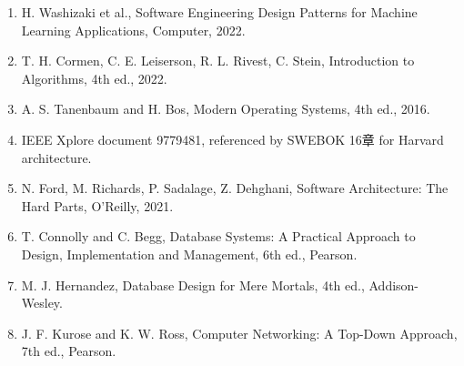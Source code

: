 \begin{enumerate}[leftmargin=2em]
\item H. Washizaki et al., Software Engineering Design Patterns for Machine Learning Applications, Computer, 2022.
\item T. H. Cormen, C. E. Leiserson, R. L. Rivest, C. Stein, Introduction to Algorithms, 4th ed., 2022.
\item A. S. Tanenbaum and H. Bos, Modern Operating Systems, 4th ed., 2016.
\item IEEE Xplore document 9779481, referenced by SWEBOK 16章 for Harvard architecture.
\item N. Ford, M. Richards, P. Sadalage, Z. Dehghani, Software Architecture: The Hard Parts, O'Reilly, 2021.
\item T. Connolly and C. Begg, Database Systems: A Practical Approach to Design, Implementation and Management, 6th ed., Pearson.
\item M. J. Hernandez, Database Design for Mere Mortals, 4th ed., Addison-Wesley.
\item J. F. Kurose and K. W. Ross, Computer Networking: A Top-Down Approach, 7th ed., Pearson.
\end{enumerate}
